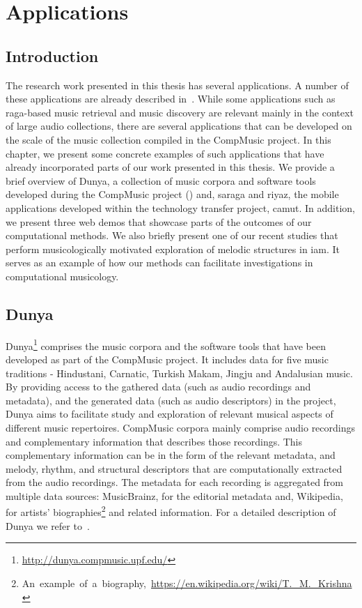 
\chapter{Applications}
\label{chap:applicatoins}

\section{Introduction}
\label{sec:applications_introduction}

The research work presented in this thesis has several applications. A number of these applications are already described in~. While some applications such as \gls{raga}-based music retrieval and music discovery are relevant mainly in the context of large audio collections, there are several applications that can be developed on the scale of the music collection compiled in the CompMusic project. In this chapter, we present some concrete examples of such applications that have already incorporated parts of our work presented in this thesis. We provide a brief overview of Dunya, a collection of music corpora and software tools developed during the CompMusic project () and, \Gls{saraga} and \Gls{riyaz}, the mobile applications developed within the technology transfer project, \gls{camut}. In addition, we present three web demos that showcase parts of the outcomes of our computational methods. We also briefly present one of our recent studies that perform musicologically motivated exploration of melodic structures in \gls{iam}. It serves as an example of how our methods can facilitate investigations in computational musicology.

\section{Dunya}
\label{sec:applications_dunya}

Dunya\footnote{\url{http://dunya.compmusic.upf.edu/}} comprises the music corpora and the software tools that have been developed as part of the CompMusic project. It includes data for five music traditions - Hindustani, Carnatic, Turkish Makam, Jingju and Andalusian music. By providing access to the gathered data (such as audio recordings and metadata), and the generated data (such as audio descriptors) in the project, Dunya aims to facilitate study and exploration of relevant musical aspects of different music repertoires. CompMusic corpora mainly comprise audio recordings and complementary information that describes those recordings. This complementary information can be in the form of the relevant metadata, and melody, rhythm, and structural descriptors that are computationally extracted from the audio recordings. The metadata for each recording is aggregated from multiple data sources: MusicBrainz, for the editorial metadata and, Wikipedia, for artists' biographies\footnote{An~example~of~a~biography,~\url{https://en.wikipedia.org/wiki/T._M._Krishna}} and related information. For a detailed description of Dunya we refer to~\cite{dunya_porter}.


